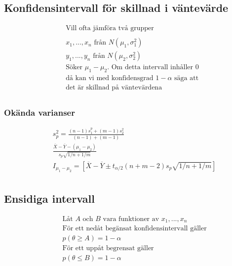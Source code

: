 \subsection{Konfidensintervall för skillnad i väntevärde }
\begin{align*}
  &\quad  \text{Vill ofta jämföra två grupper}  \\
  &\quad  \\
  &\quad  x_1,...,x_n \text{ från } N(\mu_1,\sigma^2_1) \\
  &\quad  y_1,...,y_n \text{ från } N(\mu_2,\sigma^2_2) \\
  &\quad  \text{Söker $\mu_1-\mu_2$. Om detta intervall inhåller $0$ } \\
  &\quad  \text{då kan vi med konfidensgrad $1-\alpha$ säga att}  \\
  &\quad  \text{det är skillnad på väntevärdena}  \\
\end{align*}

\subsubsection{Okända varianser}
\begin{align*}
  &\quad  s_p^2 = \frac{(n-1)s_1^p+(m-1)s_2^2}{(n-1)+(m-1)} \\
  &\quad  \frac{\overline{X}-\overline{Y}-(\mu_1-\mu_2)}{s_p\sqrt{1/n+1/m}} \\
  &\quad  I_{\mu_1-\mu_2} = [\overline{X}-\overline{Y}\pm t_{\alpha/2}(n+m-2)s_p\sqrt{1/n+1/m}] \\
\end{align*}

\subsection{Ensidiga intervall}
\begin{align*}
  &\quad  \text{Låt $A$ och $B$ vara funktioner av }  x_1,...,x_n \\
  &\quad  \text{För ett nedåt begänsat konfidensintervall gäller} \\
  &\quad  p(\theta\geq{A})=1-\alpha \\
  &\quad  \text{För ett uppåt begrensat gäller} \\
  &\quad  p(\theta\leq{B})=1-\alpha \\
\end{align*}

